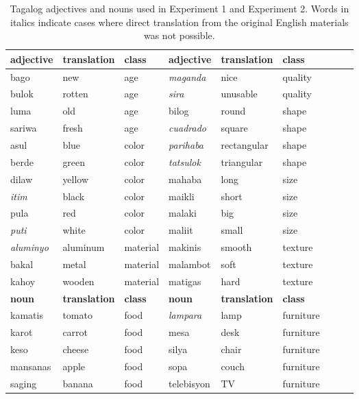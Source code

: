 \documentclass[12pt,letterpaper]{article}
\begin{document}
\begin{table}
	\centering
	{
		\begin{tabular}{lllllllll} \toprule
			\textbf{adjective}  & \textbf{translation} & \textbf{class} &  \textbf{adjective}  & \textbf{translation} & \textbf{class}\\ \midrule
			bago & new & age & \emph{maganda} & nice & quality \\
			bulok & rotten & age & \emph{sira} & unusable & quality \\
			luma & old & age & bilog & round & shape  \\
			sariwa & fresh & age & \emph{cuadrado} & square & shape  \\
			asul & blue & color & \emph{parihaba} & rectangular & shape \\
			berde & green & color & \emph{tatsulok} & triangular & shape  \\
			dilaw & yellow & color & mahaba & long & size \\
			\emph{itim} & black & color & maikli & short & size \\
			pula & red & color & malaki & big & size \\
			\emph{puti} & white & color & maliit & small & size  \\
			\emph{aluminyo} & aluminum & material & makinis & smooth & texture \\
			bakal & metal & material & malambot & soft & texture \\
			kahoy & wooden & material & matigas & hard & texture \\ \midrule
			\textbf{noun} & \textbf{translation} & \textbf{class} & \textbf{noun} & \textbf{translation} & \textbf{class}\\ \midrule
			kamatis & tomato & food &  \emph{lampara} & lamp & furniture \\
			karot & carrot & food & mesa & desk & furniture \\
			keso & cheese & food & silya & chair & furniture \\
			mansanas & apple & food & sopa & couch & furniture \\
			saging & banana & food & telebisyon & TV & furniture \\ \bottomrule
		\end{tabular}
		\caption{Tagalog adjectives and nouns used in Experiment 1 and Experiment 2. Words in italics indicate cases where direct translation from the original English materials was not possible.}
		\label{tagalog-materials}
	}
\end{table}
\end{document}
